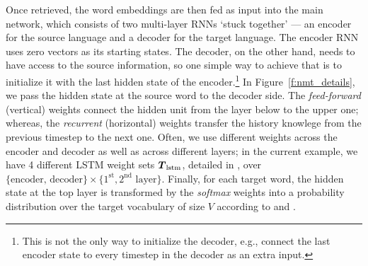 Once retrieved, the word embeddings are then fed as input into the main network, which consists
of two multi-layer RNNs `stuck together' --- an encoder for the source
language and a decoder for the target language. 
The encoder RNN uses zero vectors as its starting states. The decoder, on the
other hand, needs to have access to the source information, so one simple way to
achieve that is to
initialize it with the last hidden state of the encoder.\footnote{This is not the only way to initialize the decoder,
e.g.,  connect the last encoder state to every timestep in the
decoder as an extra input.} In Figure~\ref{f:nmt_details}, we pass  
the hidden state at the source word  to the decoder side.
The \emph{feed-forward} (vertical) weights connect
the hidden unit from the layer below to the upper one; whereas, the
\emph{recurrent} (horizontal) weights transfer the history knowlege from the previous
timestep to the next one.
Often, we use different weights across the encoder and decoder as well as
across different layers; in the current example, we have 4 different LSTM
weight sets $\mbox{\boldmath{$T$}}_{\text{lstm}}$, detailed in , over $\{\text{encoder,
decoder}\} \times \{1^{\text{st}}, 2^{\text{nd}} \text{ layer}\}$.
Finally, for each target word, the hidden state at the top layer is transformed by the
\emph{softmax} weights into a probability distribution over the target
vocabulary of size $V$ according to  and . 


